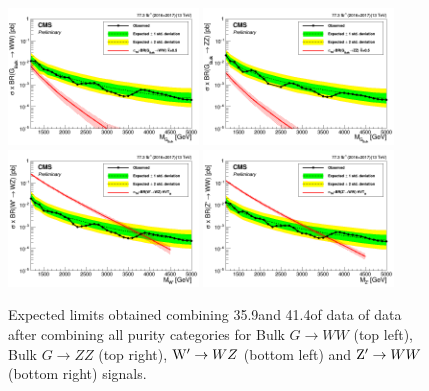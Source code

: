 \begin{figure}[h!]
\centering
\includegraphics[width=0.45\textwidth]{figures/analysis/search3/AN-17-303/limits/limits_BulkGWW_combo_2016_2017.png}
\includegraphics[width=0.45\textwidth]{figures/analysis/search3/AN-17-303/limits/limits_BulkGZZ_combo_2016_2017.png}\\
\includegraphics[width=0.45\textwidth]{figures/analysis/search3/AN-17-303/limits/limits_WprimeWZ_combo_2016_2017.png}
\includegraphics[width=0.45\textwidth]{figures/analysis/search3/AN-17-303/limits/limits_ZprimeWW_combo_2016_2017.png}
\caption{Expected limits obtained combining 35.9\fbinv and 41.4\fbinv of data of data after combining all purity categories for Bulk $G\rightarrow WW$ (top left), Bulk $G\rightarrow ZZ$ 
(top right), $\mathrm{W}^\prime\rightarrow WZ$ (bottom left) and $\mathrm{Z}^\prime\rightarrow WW$ (bottom right) signals.}
\label{fig:searchIII:limitsCombo}
\end{figure}
